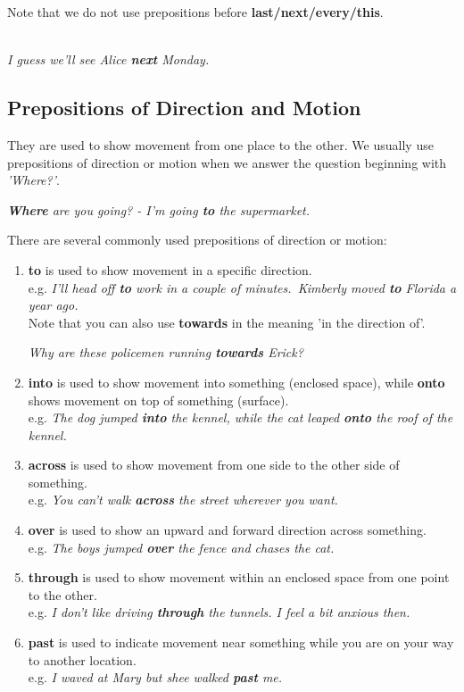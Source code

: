 \documentclass[hidelinks,10pt,a4paper]{article}
\begin{document}
Note that we do not use prepositions before \textbf{last/next/every/this}.\\
\begin{center}
	\textit{\\
	I guess we'll see Alice \textbf{next} Monday.}
\end{center}

\subsection{Prepositions of Direction and Motion}
They are used to show movement from one place to the other. We usually use prepositions of direction or motion when we answer the question beginning with \textit{'Where?'}.

\begin{center}
	\textit{\textbf{Where} are you going? - I'm going \textbf{to} the supermarket.}
\end{center}

There are several commonly used prepositions of direction or motion:
\begin{enumerate}[label=(\alph*)]
	\item \textbf{to} is used to show movement in a specific direction. \\
		e.g. \textit{I'll head off \textbf{to} work in a couple of minutes.\
		Kimberly moved \textbf{to} Florida a year ago.} \\

		Note that you can also use \textbf{towards} in the meaning 'in the direction of'.
		\begin{center}
			\textit{Why are these policemen running \textbf{towards} Erick? }
		\end{center}
	\item \textbf{into} is used to show movement into something (enclosed space), while \textbf{onto} shows movement on top of something (surface). \\
		e.g. \textit{The dog jumped \textbf{into} the kennel, while the cat leaped \textbf{onto} the roof of the kennel.}
	\item \textbf{across} is used to show movement from one side to the other side of something. \\
		e.g. \textit{You can't walk \textbf{across} the street wherever you want.}
	\item \textbf{over} is used to show an upward and forward direction across something. \\
		e.g. \textit{The boys jumped \textbf{over} the fence and chases the cat.}
	\item \textbf{through} is used to show movement within an enclosed space from one point to the other. \\
		e.g. \textit{I don't like driving \textbf{through} the tunnels. I feel a bit anxious then.}
	\item \textbf{past} is used to indicate movement near something while you are on your way to another location. \\
		e.g. \textit{I waved at Mary but shee walked \textbf{past} me.}
\end{enumerate}
\end{document}
